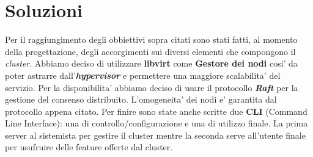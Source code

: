 \section{Soluzioni}
Per il raggiungimento degli obbiettivi sopra citati sono stati fatti,
al momento della progettazione, degli accorgimenti sui diversi 
elementi che compongono il \textit{cluster}.
Abbiamo deciso di utilizzare \textbf{libvirt} come \textbf{Gestore dei nodi} cosi' da poter astrarre 
dall'\textit{\textbf{hypervisor}} e permettere una maggiore scalabilita' del servizio.
Per la disponibilita' abbiamo deciso di usare il protocollo \textit{\textbf{Raft}} per la
gestione del consenso distribuito. L'omogeneita' dei nodi e' garantita dal protocollo appena 
citato. Per finire sono state anche scritte due \textbf{CLI} (Command Line Interface): 
una di controllo/configurazione e una di utilizzo finale.
La prima server al sistemista per gestire il cluster mentre la seconda serve all'utente finale 
per usufruire delle feature offerte dal cluster.
        
